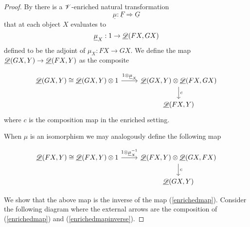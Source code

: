 \documentclass[Thesis.tex]{subfiles}
\begin{document}
\begin{proof}
By  there is a $\mathscr{V}$-enriched natural transformation 
\[\underline{\mu}:\underline{F}\Rightarrow\underline{G}\]
that at each object $X$ evaluates to \[\underline{\mu}_X:1\to\underline{\mathscr{D}}(FX,GX)\] defined to be the adjoint of $\mu_X:FX\to GX$. We define the map $\underline{\mathscr{D}}(GX,Y)\to\underline{\mathscr{D}}(FX,Y)$ as the composite

\begin{equation}\label{enrichedmap}
\begin{tikzcd}
\uD(GX,Y)\cong\uD(GX,Y)\otimes 1\arrow[r,"1\otimes\umu_X"]&\uD(GX,Y)\otimes\uD(FX,GX)\arrow[d, "c"]\\ 
& \uD(FX,Y)
\end{tikzcd}
\end{equation}
where $c$ is the composition map in the enriched setting. 

When $\mu$ is an isomorphism we may analogously define the following map

\begin{equation}\label{enrichedmapinverse}
\begin{tikzcd}
\uD(FX,Y)\cong\uD(FX,Y)\otimes 1\arrow[r,"1\otimes\umui_X"]&\uD(FX,Y)\otimes\uD(GX,FX)\arrow[d, "c"]\\ 
& \uD(GX,Y)
\end{tikzcd}
\end{equation}

We show that the above map is the inverse of the map (\ref{enrichedmap}). Consider the following diagram where the external arrows are the composition of (\ref{enrichedmap}) and (\ref{enrichedmapinverse}).


\end{proof}
\end{document}
